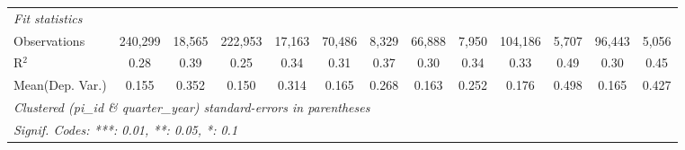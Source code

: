 \begin{tabular}{lcccccccccccc}
   \midrule
   \emph{Fit statistics}\\
   Observations                                               & 240,299        & 18,565         & 222,953        & 17,163         & 70,486         & 8,329          & 66,888         & 7,950          & 104,186        & 5,707          & 96,443         & 5,056\\  
   R$^2$                                                      & 0.28           & 0.39           & 0.25           & 0.34           & 0.31           & 0.37           & 0.30           & 0.34           & 0.33           & 0.49           & 0.30           & 0.45\\  
Mean(Dep. Var.) & 0.155 & 0.352 & 0.150 & 0.314 & 0.165 & 0.268 & 0.163 & 0.252 & 0.176 & 0.498 & 0.165 & 0.427 \\
   \midrule \midrule
   \multicolumn{13}{l}{\emph{Clustered (pi\_id \& quarter\_year) standard-errors in parentheses}}\\
   \multicolumn{13}{l}{\emph{Signif. Codes: ***: 0.01, **: 0.05, *: 0.1}}\\
\end{tabular}
\par\endgroup
